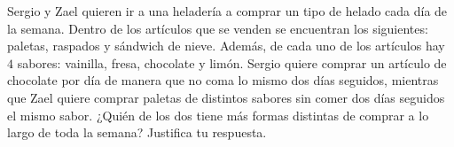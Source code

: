 Sergio y Zael quieren ir a una heladería a comprar un tipo de helado cada día de la semana. Dentro de los artículos que se venden se encuentran los siguientes: paletas, raspados y sándwich de nieve. Además, de cada uno de los artículos hay $4$ sabores: vainilla, fresa, chocolate y limón. Sergio quiere comprar un artículo de chocolate por día de manera que no coma lo mismo dos días seguidos, mientras que Zael quiere comprar paletas de distintos sabores sin comer dos días seguidos el mismo sabor. ¿Quién de los dos tiene más formas distintas de comprar a lo largo de toda la semana? Justifica tu respuesta.